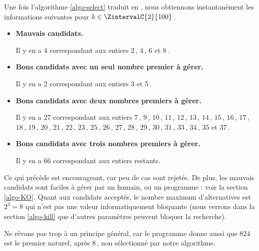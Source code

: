 

\medskip

Une fois l'algorithme \ref{algo-select} traduit en \python, nous obtiennons instantanément les informations suivantes pour $k \in \ZintervalC{2}{100}$\,.
%
\begin{itemize}
	\item \textbf{Mauvais candidats.}
	
	\noindent
	Il y en a 4 correspondant aux entiers $2$\,, $4$\,, $6$ et $8$\,.
	
	\item \textbf{Bons candidats avec un seul nombre premier à gérer.}
	
	\noindent
	Il y en a 2 correspondant aux entiers $3$ et $5$\,.
	
	\item \textbf{Bons candidats avec deux nombres premiers à gérer.}
	
	\noindent
	Il y en a 27 correspondant aux entiers $7$\,, $9$\,, $10$\,, $11$\,, $12$\,, $13$\,, $14$\,, $15$\,, $16$\,, $17$\,, $18$\,, $19$\,, $20$\,, $21$\,, $22$\,, $23$\,, $25$\,, $26$\,, $27$\,, $28$\,, $29$\,, $30$\,, $31$\,, $33$\,, $34$\,, $35$ et $37$\,.

	\item\textbf{Bons candidats avec trois nombres premiers à gérer.}
	
	\noindent
	Il y en a 66 correspondant aux entiers restants.
\end{itemize}


Ce qui précède est encourageant, car peu de cas sont rejetés.
De plus, les mauvais candidats sont faciles à gérer par un humain, ou un programme : voir la section \ref{algo-KO}.
Quant aux candidats acceptés, le nombre maximum d'alternatives est $2^3 = 8$ qui n'est pas une valeur informatiquement bloquante (nous verrons dans la section \ref{algo-kill} que d'autres paramètres peuvent bloquer la recherche).



\begin{remark}
	Ne rêvons pas trop à un principe général, car le programme donne aussi que $824$ est le premier naturel, après $8$\,, non sélectionné par notre algorithme.
\end{remark}